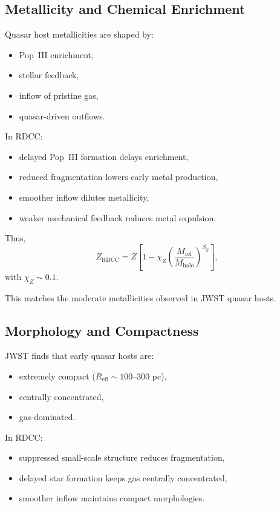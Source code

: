 \documentclass[11pt,a4paper]{article}
\begin{document}
\subsection{Metallicity and Chemical Enrichment}

Quasar host metallicities are shaped by:
\begin{itemize}
\item Pop~III enrichment,
\item stellar feedback,
\item inflow of pristine gas,
\item quasar-driven outflows.
\end{itemize}

In RDCC:
\begin{itemize}
\item delayed Pop~III formation delays enrichment,
\item reduced fragmentation lowers early metal production,
\item smoother inflow dilutes metallicity,
\item weaker mechanical feedback reduces metal expulsion.
\end{itemize}

Thus,
\begin{equation}
Z_{\mathrm{RDCC}}
=
Z
\left[
1
-
\chi_{Z}
\left(
\frac{M_{\mathrm{rel}}}{M_{\mathrm{halo}}}
\right)^{\beta_{Z}}
\right],
\end{equation}
with $\chi_{Z} \sim 0.1$.

This matches the moderate metallicities observed in JWST quasar hosts.

\subsection{Morphology and Compactness}

JWST finds that early quasar hosts are:
\begin{itemize}
\item extremely compact ($R_{\mathrm{eff}} \sim 100$–$300$ pc),
\item centrally concentrated,
\item gas-dominated.
\end{itemize}

In RDCC:
\begin{itemize}
\item suppressed small-scale structure reduces fragmentation,
\item delayed star formation keeps gas centrally concentrated,
\item smoother inflow maintains compact morphologies.
\end{itemize}
\end{document}
